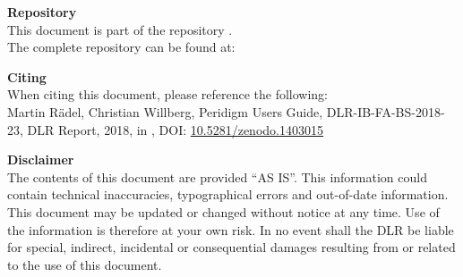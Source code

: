 {  \vspace{3em}
  
  \begin{minipage}{0.7\linewidth}
    {\bfseries Repository}\\%
    This document is part of the \reponame{} repository \cite{PeriDoX}.\\
    The complete repository can be found at:
    
    \href{\repoaddress}{\repoaddress}
  \end{minipage}
  \begin{minipage}{0.29\linewidth}
    \centering
    \centering
    {%
      \hypersetup{colorlinks=false,linkcolor=black}
      \repoqrcode
    }
  \end{minipage}
  
  \vspace{3em}
  
  \begin{minipage}{\linewidth}
    {\bfseries Citing}\\%
    When citing this document, please reference the following:\\
    Martin R{\"a}del, Christian Willberg, Peridigm Users Guide, DLR-IB-FA-BS-2018-23, DLR Report, 2018, in \reponame{}, DOI: \href{https://github.com/PeriDoX/PeriDoX}{10.5281/zenodo.1403015}
  \end{minipage}
  
  \vfill
  
  {\bfseries Disclaimer}\\%
  The contents of this document are provided ``AS IS''.  This information could contain technical inaccuracies, typographical errors and out-of-date information. This document may be updated or changed without notice at any time. Use of the information is therefore at your own risk. In no event shall the DLR be liable for special, indirect, incidental or consequential damages resulting from or related to the use of this document.
}
\makeatother
